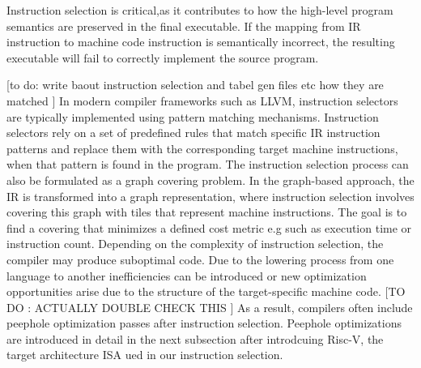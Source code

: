 Instruction selection is critical,as it contributes to how the high-level program semantics are preserved in the final executable. If the mapping from IR instruction to machine code instruction is semantically incorrect, the resulting executable will fail to correctly implement the source program.

[to do: write baout instruction selection and tabel gen files etc how they are matched ]
In modern compiler frameworks such as LLVM, instruction selectors are typically implemented using pattern matching mechanisms. Instruction selectors rely on a set of predefined rules that match specific IR instruction patterns and replace them with the corresponding target machine instructions, when that pattern is found in the program. The instruction selection process can also be formulated as a graph covering problem. In the graph-based approach, the IR is transformed into a graph representation, where instruction selection involves covering this graph with tiles that represent machine instructions. The goal is to find a covering that minimizes a defined cost metric e.g such as execution time or instruction count. Depending on the complexity of instruction selection, the compiler may produce suboptimal code. Due to the lowering process from one language to another inefficiencies can be introduced or new optimization opportunities arise due to the structure of the target-specific machine code. 
[TO DO : ACTUALLY DOUBLE CHECK THIS ]
As a result, compilers often include peephole optimization passes after instruction selection. Peephole optimizations are introduced in detail in the next subsection after introdcuing Risc-V, the target architecture ISA ued in our instruction selection.

